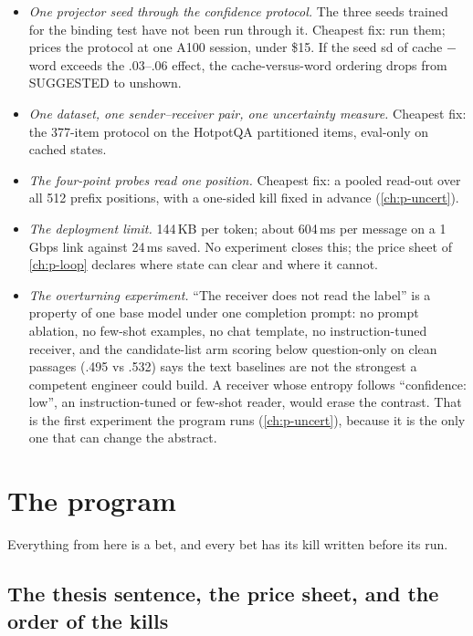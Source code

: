\documentclass[11pt,a4paper]{report}
\begin{document}
\begin{itemize}
\item \emph{One projector seed through the confidence protocol.} The three seeds trained for the binding test have not been run through it. Cheapest fix: run them;  prices the protocol at one A100 session, under \$15. If the seed sd of cache $-$ word exceeds the .03--.06 effect, the cache-versus-word ordering drops from SUGGESTED to unshown.
\item \emph{One dataset, one sender--receiver pair, one uncertainty measure.} Cheapest fix: the 377-item protocol on the HotpotQA partitioned items, eval-only on cached states.
\item \emph{The four-point probes read one position.} Cheapest fix: a pooled read-out over all 512 prefix positions, with a one-sided kill fixed in advance (\cref{ch:p-uncert}).
\item \emph{The deployment limit.} 144\,KB per token; about 604\,ms per message on a 1\,Gbps link against 24\,ms saved. No experiment closes this; the price sheet of \cref{ch:p-loop} declares where state can clear and where it cannot.
\item \emph{The overturning experiment.} ``The receiver does not read the label'' is a property of one base model under one completion prompt: no prompt ablation, no few-shot examples, no chat template, no instruction-tuned receiver, and the candidate-list arm scoring below question-only on clean passages (.495 vs .532) says the text baselines are not the strongest a competent engineer could build. A receiver whose entropy follows ``confidence: low'', an instruction-tuned or few-shot reader, would erase the contrast. That is the first experiment the program runs (\cref{ch:p-uncert}), because it is the only one that can change the abstract.
\end{itemize}

\part{The program}
\label{part:program}

\noindent Everything from here is a bet, and every bet has its kill written before its run.

\chapter{The thesis sentence, the price sheet, and the order of the kills}
\label{ch:program}
\end{document}
